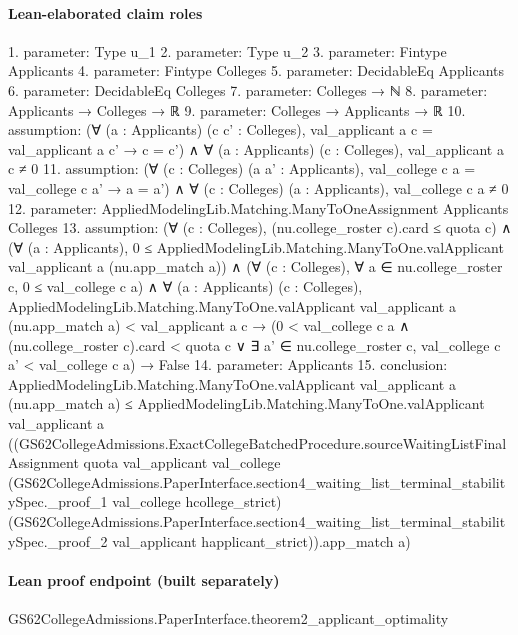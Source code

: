 \documentclass[10pt]{article}
\begin{document}
\paragraph{Lean-elaborated claim roles}\begin{ReviewVerbatim}
1. parameter: Type u_1
2. parameter: Type u_2
3. parameter: Fintype Applicants
4. parameter: Fintype Colleges
5. parameter: DecidableEq Applicants
6. parameter: DecidableEq Colleges
7. parameter: Colleges → ℕ
8. parameter: Applicants → Colleges → ℝ
9. parameter: Colleges → Applicants → ℝ
10. assumption: (∀ (a : Applicants) (c c' : Colleges), val_applicant a c = val_applicant a c' → c = c') ∧
  ∀ (a : Applicants) (c : Colleges), val_applicant a c ≠ 0
11. assumption: (∀ (c : Colleges) (a a' : Applicants), val_college c a = val_college c a' → a = a') ∧
  ∀ (c : Colleges) (a : Applicants), val_college c a ≠ 0
12. parameter: AppliedModelingLib.Matching.ManyToOneAssignment Applicants Colleges
13. assumption: (∀ (c : Colleges), (nu.college_roster c).card ≤ quota c) ∧
  (∀ (a : Applicants), 0 ≤ AppliedModelingLib.Matching.ManyToOne.valApplicant val_applicant a (nu.app_match a)) ∧
    (∀ (c : Colleges), ∀ a ∈ nu.college_roster c, 0 ≤ val_college c a) ∧
      ∀ (a : Applicants) (c : Colleges),
        AppliedModelingLib.Matching.ManyToOne.valApplicant val_applicant a (nu.app_match a) < val_applicant a c →
          (0 < val_college c a ∧ (nu.college_roster c).card < quota c ∨
              ∃ a' ∈ nu.college_roster c, val_college c a' < val_college c a) →
            False
14. parameter: Applicants
15. conclusion: AppliedModelingLib.Matching.ManyToOne.valApplicant val_applicant a (nu.app_match a) ≤
  AppliedModelingLib.Matching.ManyToOne.valApplicant val_applicant a
    ((GS62CollegeAdmissions.ExactCollegeBatchedProcedure.sourceWaitingListFinalAssignment quota val_applicant
          val_college
          (GS62CollegeAdmissions.PaperInterface.section4_waiting_list_terminal_stabilitySpec._proof_1 val_college
            hcollege_strict)
          (GS62CollegeAdmissions.PaperInterface.section4_waiting_list_terminal_stabilitySpec._proof_2 val_applicant
            happlicant_strict)).app_match
      a)
\end{ReviewVerbatim}

\paragraph{Lean proof endpoint (built separately)}\begin{ReviewVerbatim}
GS62CollegeAdmissions.PaperInterface.theorem2_applicant_optimality
\end{ReviewVerbatim}
\end{document}
